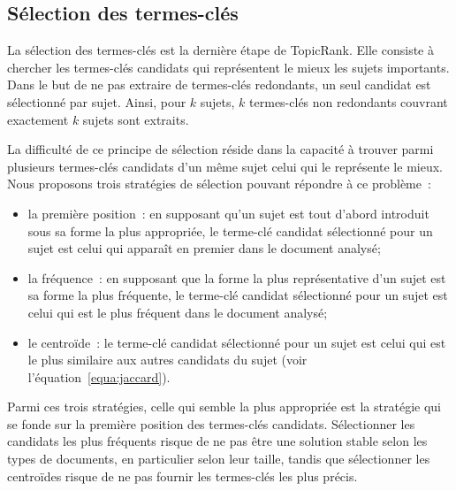   \subsection{Sélection des termes-clés}
  \label{subsec:selection_des_termes_cles}
    La sélection des termes-clés est la dernière étape de TopicRank. Elle
    consiste à chercher les termes-clés candidats qui représentent le mieux les
    sujets importants. Dans le but de ne pas extraire de termes-clés redondants,
    un seul candidat est sélectionné par sujet.
    Ainsi, pour $k$ sujets, $k$ termes-clés non redondants couvrant exactement
    $k$ sujets sont extraits.

    La difficulté de ce principe de sélection réside dans la capacité à trouver
    parmi plusieurs termes-clés candidats d'un même sujet celui qui le
    représente le mieux. Nous proposons trois stratégies de sélection pouvant
    répondre à ce problème~:
    \begin{itemize}
      \item{la première position~: en supposant qu'un sujet est tout d'abord
            introduit sous sa forme la plus appropriée, le terme-clé candidat
            sélectionné pour un sujet est celui qui apparaît en premier dans le
            document analysé;}
      \item{la fréquence~: en supposant que la forme la plus représentative d'un
            sujet est sa forme la plus fréquente, le terme-clé candidat
            sélectionné pour un sujet est celui qui est le plus fréquent dans le
            document analysé;}
      \item{le centroïde~: le terme-clé candidat sélectionné pour un sujet est
            celui qui est le plus similaire aux autres candidats du sujet (voir
            l'équation~\ref{equa:jaccard}).}
    \end{itemize}
    Parmi ces trois stratégies, celle qui semble la plus appropriée est la
    stratégie qui se fonde sur la première position des termes-clés candidats.
    Sélectionner les candidats les plus fréquents risque de ne pas être une
    solution stable selon les types de documents, en particulier selon leur
    taille, tandis que sélectionner les centroïdes risque de ne pas fournir les
    termes-clés les plus précis.

